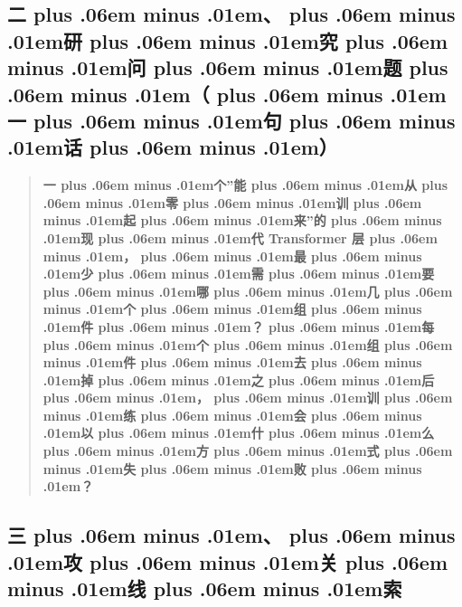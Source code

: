 \documentclass[
]{article}
\def\zh#1{{\zhfont #1}}
\def\zhglue{\hskip0pt plus .06em minus .01em}
\begin{document}
\subsection{\zh{二\zhglue 、\zhglue 研\zhglue 究\zhglue 问\zhglue 题\zhglue （\zhglue 一\zhglue 句\zhglue 话\zhglue ）}}\label{ux4e8cux7814ux7a76ux95eeux9898ux4e00ux53e5ux8bdd}

\begin{quote}
\textbf{\zh{一\zhglue 个}''\zh{能\zhglue 从\zhglue 零\zhglue 训\zhglue 起\zhglue 来}''\zh{的\zhglue 现\zhglue 代} Transformer \zh{层\zhglue ，\zhglue 最\zhglue 少\zhglue 需\zhglue 要\zhglue 哪\zhglue 几\zhglue 个\zhglue 组\zhglue 件\zhglue ？\zhglue 每\zhglue 个\zhglue 组\zhglue 件\zhglue 去\zhglue 掉\zhglue 之\zhglue 后\zhglue ，\zhglue 训\zhglue 练\zhglue 会\zhglue 以\zhglue 什\zhglue 么\zhglue 方\zhglue 式\zhglue 失\zhglue 败\zhglue ？}}
\end{quote}

\subsection{\zh{三\zhglue 、\zhglue 攻\zhglue 关\zhglue 线\zhglue 索}}\label{ux4e09ux653bux5173ux7ebfux7d22}
\end{document}
